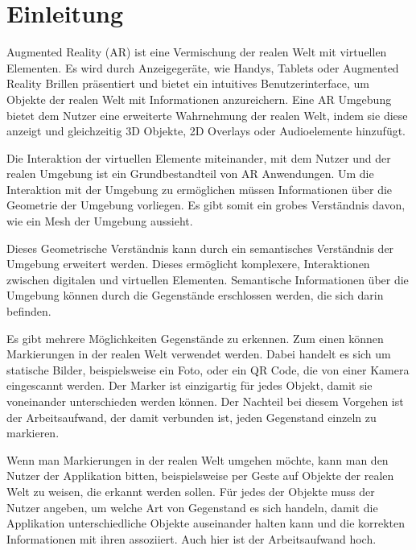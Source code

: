 \section{Einleitung}

Augmented Reality (AR) ist eine Vermischung der realen Welt mit virtuellen Elementen. Es wird durch Anzeigegeräte, wie Handys, Tablets oder Augmented Reality Brillen präsentiert und bietet ein intuitives Benutzerinterface, um Objekte der realen Welt mit Informationen anzureichern. Eine AR Umgebung bietet dem Nutzer eine erweiterte Wahrnehmung der realen Welt, indem sie diese anzeigt und gleichzeitig 3D Objekte, 2D Overlays oder Audioelemente  hinzufügt. %

Die Interaktion der virtuellen Elemente miteinander, mit dem Nutzer und der realen Umgebung ist ein Grundbestandteil von AR Anwendungen.
Um die Interaktion mit der Umgebung zu ermöglichen müssen Informationen über die Geometrie der Umgebung vorliegen. Es gibt somit ein grobes Verständnis davon, wie ein Mesh der Umgebung aussieht. 

Dieses Geometrische Verständnis kann durch ein semantisches Verständnis der Umgebung erweitert werden. Dieses ermöglicht komplexere, Interaktionen zwischen digitalen und virtuellen Elementen. Semantische Informationen über die Umgebung können durch die Gegenstände erschlossen werden, die sich darin befinden.

Es gibt mehrere Möglichkeiten Gegenstände zu erkennen. Zum einen können Markierungen in der realen Welt verwendet werden. Dabei handelt es sich um statische Bilder, beispielsweise ein Foto, oder ein QR Code, die von einer Kamera eingescannt werden. Der Marker ist einzigartig für jedes Objekt, damit sie voneinander unterschieden werden können. Der Nachteil bei diesem Vorgehen ist der Arbeitsaufwand, der damit verbunden ist, jeden Gegenstand einzeln zu markieren.%

Wenn man Markierungen in der realen Welt umgehen möchte, kann man den Nutzer der Applikation bitten, beispielsweise per Geste auf Objekte der realen Welt zu weisen, die erkannt werden sollen. Für jedes der Objekte muss der Nutzer angeben, um welche Art von Gegenstand es sich handeln, damit die Applikation unterschiedliche Objekte auseinander halten kann und die korrekten Informationen mit ihren assoziiert. Auch hier ist der Arbeitsaufwand hoch.

